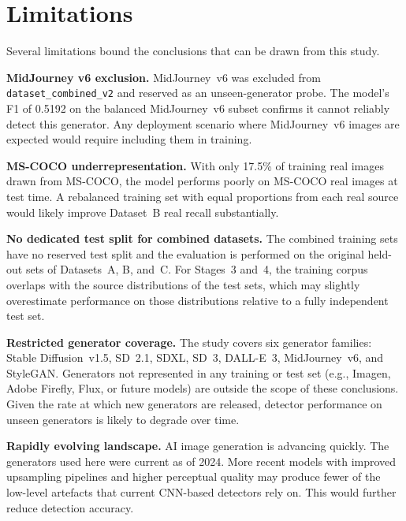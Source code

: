 
\section{Limitations}
\label{sec:limitations}

Several limitations bound the conclusions that can be drawn from this study.

\textbf{MidJourney v6 exclusion.} MidJourney~v6 was excluded from
\texttt{dataset\_combined\_v2} and reserved as an unseen-generator probe. The model's F1
of 0.5192 on the balanced MidJourney~v6 subset confirms it cannot reliably detect this
generator. Any deployment scenario where MidJourney~v6 images are expected would require
including them in training.

\textbf{MS-COCO underrepresentation.} With only 17.5\% of training real images drawn
from MS-COCO, the model performs poorly on MS-COCO real images at test time. A rebalanced
training set with equal proportions from each real source would likely improve Dataset~B
real recall substantially.

\textbf{No dedicated test split for combined datasets.} The combined training sets
have no reserved test split and the evaluation is performed on the original held-out sets of
Datasets~A, B, and~C. For Stages~3 and~4, the training corpus overlaps with the source
distributions of the test sets, which may slightly overestimate performance on those
distributions relative to a fully independent test set.

\textbf{Restricted generator coverage.} The study covers six generator families:
Stable Diffusion~v1.5, SD~2.1, SDXL, SD~3, DALL-E~3, MidJourney~v6, and StyleGAN.
Generators not represented in any training or test set (e.g., Imagen, Adobe Firefly,
Flux, or future models) are outside the scope of these conclusions. Given the rate at
which new generators are released, detector performance on unseen generators is likely
to degrade over time.

\textbf{Rapidly evolving landscape.} AI image generation is advancing quickly. The
generators used here were current as of 2024. More recent models with
improved upsampling pipelines and higher perceptual quality may produce fewer of the
low-level artefacts that current CNN-based detectors rely on. This would further reduce
detection accuracy.

